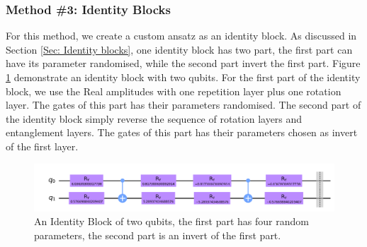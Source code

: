\subsubsection{Method \#3: Identity Blocks} \label{Sec: Method3}
For this method, we create a custom ansatz as an identity block.
As discussed in Section \ref{Sec: Identity blocks}, one identity block has two part, the first part can have its parameter randomised, while the second part invert the first part.
Figure \ref{Fig: Identity Ansatz Sample} demonstrate an identity block with two qubits.
For the first part of the identity block, we use the Real amplitudes with one repetition layer plus one rotation layer.
The gates of this part has their parameters randomised.
The second part of the identity block simply reverse the sequence of rotation layers and entanglement layers.
The gates of this part has their parameters chosen as invert of the first layer.
\begin{figure}
    \centering
    \includegraphics[width=\textwidth]{Artefact/Appendices/ansatz-identity.png}
    \caption{An Identity Block of two qubits, the first part has four random parameters, the second part is an invert of the first part.}
    \label{Fig: Identity Ansatz Sample}
\end{figure}
